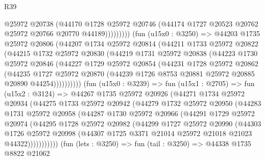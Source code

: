 \begin{lexlean}{R39}
\begin{coremodule}
                      @25972
                      @20738
                      (@44170
                        @1728
                        @25972
                        @20746
                        (@44174 @1727 @20523 @20762 @25972 @20766 @20770 @44189)))))))))
        (fun (u15x0 : @3250) =>
        @44203
          @1735
          @25972
          @20806
          (@44207
            @1734
            @25972
            @20814
            (@44211
              @1733
              @25972
              @20822
              (@44215
                @1732
                @25972
                @20830
                (@44219
                  @1731
                  @25972
                  @20838
                  (@44223
                    @1730
                    @25972
                    @20846
                    (@44227
                      @1729
                      @25972
                      @20854
                      (@44231
                        @1728
                        @25972
                        @20862
                        (@44235
                          @1727
                          @25972
                          @20870
                          (@44239 @1726 @8753 @20881 @25972 @20885 @20890 @44254))))))))))
        (fun (u15x0 : @3239) =>
        fun (u15x1 : @2705) =>
        fun (u15x2 : @3124) =>
        @44267
          @1735
          @25972
          @20926
          (@44271
            @1734
            @25972
            @20934
            (@44275
              @1733
              @25972
              @20942
              (@44279
                @1732
                @25972
                @20950
                (@44283
                  @1731
                  @25972
                  @20958
                  (@44287
                    @1730
                    @25972
                    @20966
                    (@44291
                      @1729
                      @25972
                      @20974
                      (@44295
                        @1728
                        @25972
                        @20982
                        (@44299
                          @1727
                          @25972
                          @20990
                          (@44303
                            @1726
                            @25972
                            @20998
                            (@44307 @1725 @3371 @21014 @25972 @21018 @21023 @44322)))))))))))
        (fun (lets : @3250) =>
        fun (tail : @3250) =>
        @44338
          @1735
          @8822
          @21062

\end{coremodule}
\end{lexlean}
